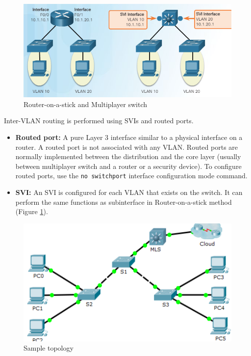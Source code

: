 \begin{figure}[hbtp]
\caption{Router-on-a-stick and Multiplayer switch}\label{Layer3sw}
\centering
\includegraphics[scale=0.6]{pictures/Layer3sw.PNG}
\end{figure}


Inter-VLAN routing is performed using SVIs and routed ports.
\begin{itemize}
\item \textbf{Routed port:} A pure Layer 3 interface similar to a physical interface on a router. A routed port is not associated with any VLAN. Routed ports are normally implemented between the distribution and the core layer (usually between multiplayer switch and a router or a security device). To configure routed ports, use the \verb|no switchport| interface configuration mode command.

\item \textbf{SVI:} An SVI is configured for each VLAN that exists on the switch. It can perform the same functions as subinterface in Router-on-a-stick method (Figure \ref{Layer3sw}). 
\end{itemize}

\begin{figure}[hbtp]
\caption{Sample topology}\label{Layer3topology}
\centering
\includegraphics[scale=0.6]{pictures/Layer3topology.PNG}
\end{figure}


